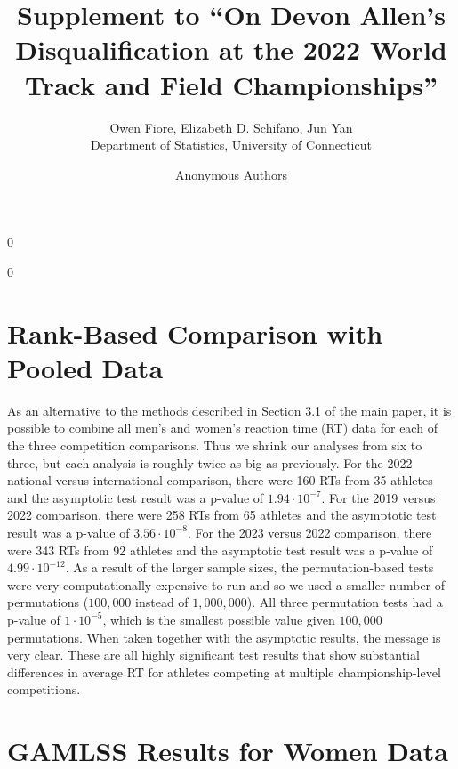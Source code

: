 \documentclass[12pt, letterpaper]{article}
\newcommand{\blind}{0}
\begin{document}
\title{\bf Supplement to ``On Devon Allen's Disqualification at the 2022 World Track and Field Championships''}

\blind
{
  \author{Owen Fiore, %
  Elizabeth D. Schifano, %
  Jun Yan\\[1ex]
  Department of Statistics, University of Connecticut\\
}
} \fi

\blind
{
  \bigskip
  \bigskip
  \bigskip
  \author{Anonymous Authors}
  \bigskip
} \fi

\maketitle 

\section{Rank-Based Comparison with Pooled Data}

As an alternative to the methods described in Section 3.1 of the main paper, it
is possible to combine all men's and women's reaction time (RT) data for each of 
the three competition
comparisons.  Thus we shrink our analyses from six to three, but each analysis
is roughly twice as big as previously.
For the 2022 national versus
international comparison, there were 160 RTs from 35
athletes and the asymptotic test result was a p-value of $1.94 \cdot 10^{-7}$.
For the 2019 versus 2022 comparison,
there were 258 RTs from 65 athletes and the asymptotic
test result was a p-value of $3.56 \cdot 10^{-8}$. 
For the 2023 versus 2022 comparison, there were 343 RTs
from 92 athletes and the asymptotic test result was a p-value of
$4.99 \cdot 10^{-12}$.  As a result of the larger sample sizes, the 
permutation-based tests were very computationally expensive to run and so we 
used a smaller number of permutations ($100,000$ instead of $1,000,000$).  All
three permutation tests had a p-value of $1 \cdot 10^{-5}$, which is the smallest
possible value given $100,000$ permutations.  When taken together
with the asymptotic results, the message is very clear. These are all
highly significant test results that show substantial differences in average RT
for athletes competing at multiple championship-level competitions.


\section{GAMLSS Results for Women Data}
\end{document}
